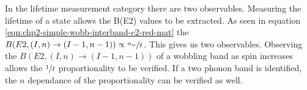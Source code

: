 In the lifetime measurement category there are two observables. Measuring the lifetime of a state allows the B(E2) values to be extracted. As seen in equation \ref{eqn:chp2-simple-wobb-interband-e2-red-mat} the $B(E2,(I,n)\rightarrow(I-1,n-1)) \propto \sfrac{n_w}{I}$. This gives us two observables. Observing the $B(E2,(I,n)\rightarrow(I-1,n-1))$ of a wobbling band as spin increases allows the $\sfrac{1}{I}$ proportionality to be verified. If a two phonon band is identified, the $n$ dependance of the proportionality can be verified as well.

